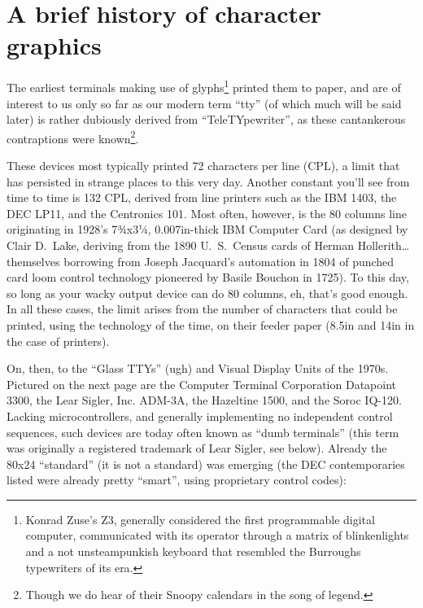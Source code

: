 \documentclass[letterpaper,10pt]{article}
\begin{document}
\newpage

\section{A brief history of character graphics}
The earliest terminals making use of glyphs\footnote{Konrad Zuse's Z3, generally
 considered the first programmable digital computer, communicated with its
operator through a matrix of blinkenlights and a not unsteampunkish keyboard that resembled the
Burroughs typewriters of its era\cite{zuse}.} printed them to paper, and are of
interest to us only so far as our modern term ``tty'' (of which much will be
said later) is rather dubiously derived from ``TeleTYpewriter'', as these
cantankerous contraptions were known\footnote{Though we do hear of their Snoopy
calendars in the song of legend\cite{quiche}.}.

These devices most typically printed 72 characters per line (CPL), a limit that
has persisted in strange places to this very day\cite{pandoc}. Another constant
you'll see from time to time is 132 CPL, derived from line printers such as the
IBM 1403, the DEC LP11, and the Centronics 101\cite{ibm1403}. Most often,
however, is the 80 columns line originating in 1928's 7¾x3¼, 0.007in-thick IBM
Computer Card (as designed by Clair D.\ Lake, deriving from the 1890 U.\ S.\
Census cards of Herman Hollerith\ldots themselves borrowing from Joseph
Jacquard's automation in 1804 of punched card loom control technology pioneered
by Basile Bouchon in 1725\cite{cards}). To this day, so long as your wacky
output device can do 80 columns, eh, that's good enough. In all these cases,
the limit arises from the number of characters that could be printed, using the
technology of the time, on their feeder paper (8.5in and 14in in the case of
printers).

On, then, to the ``Glass TTYs'' (ugh) and Visual Display Units of the 1970s.
Pictured on the next page are the Computer Terminal Corporation Datapoint 3300, the
Lear Sigler, Inc. ADM-3A, the Hazeltine 1500, and the Soroc IQ-120.
Lacking microcontrollers, and generally implementing no independent control
sequences, such devices are today often known as ``dumb terminals'' (this term
was originally a registered trademark of Lear Sigler, see below). Already the
80x24 ``standard'' (it is not a standard) was emerging (the DEC contemporaries
listed were already pretty ``smart'', using proprietary control codes):

\vspace{.25in}
\end{document}
